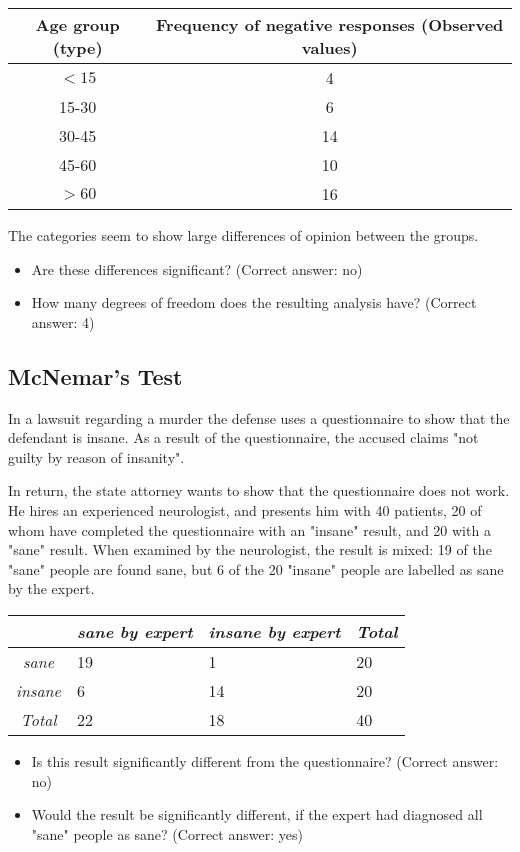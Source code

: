 \begin{table}[h]
    \centering
    \begin{tabular}{c|c}
      Age group (type) &	Frequency of negative responses (Observed values)\\
      \hline
      $<15$ & 4 \\
      15-30 & 6 \\
      30-45 & 14 \\
      45-60 & 10 \\
      $>60$ & 16
    \end{tabular}
\end{table}

The categories seem to show large differences of opinion between the groups.

\begin{itemize}
  \item     Are these differences significant?
    (Correct answer: no)

  \item     How many degrees of freedom does the resulting analysis have?
    (Correct answer: 4)

\end{itemize}

\subsection{McNemar's Test}

In a lawsuit regarding a murder the defense uses a questionnaire to show that the defendant is insane. As a result of the questionnaire, the accused claims "not guilty by reason of insanity".

In return, the state attorney wants to show that the questionnaire does not work. He hires an experienced neurologist, and presents him with 40 patients, 20 of whom have completed the questionnaire with an "insane" result, and 20 with a "sane" result. When examined by the neurologist, the result is mixed: 19 of the "sane" people are found sane, but 6 of the 20 "insane" people are labelled as sane by the expert.

\begin{table}[h]
  \centering
  \begin{tabular}{|c|l l | l|}
  \hline
  & \emph{sane by expert} & \emph{insane by expert} & \emph{Total} \\
  \hline
  \emph{sane} & 19 & 1 & 20 \\
  \emph{insane} & 6 & 14 & 20 \\
  \hline
  \emph{Total} & 22 & 18 & 40 \\
  \hline
  \end{tabular}
\end{table}


\begin{itemize}
  \item     Is this result significantly different from the questionnaire?
    (Correct answer: no)

  \item     Would the result be significantly different, if the expert had diagnosed all "sane" people as sane?
    (Correct answer: yes)
\end{itemize} 